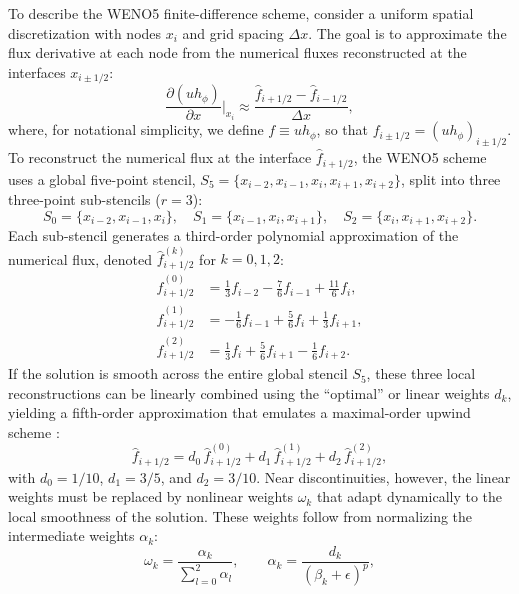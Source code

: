 \documentclass[lineno]{JFM-FLM_Au}
\begin{document}
To describe the WENO5 finite-difference scheme, consider a uniform spatial discretization with nodes $x_i$ and grid spacing $\Delta x$. The goal is to approximate the flux derivative at each node from the numerical fluxes reconstructed at the interfaces $x_{i\pm1/2}$:
\begin{equation}
    \frac{\partial (u h_\phi)}{\partial x}\bigg|_{x_i} \approx \frac{\hat f_{i+1/2} - \hat f_{i-1/2}}{\Delta x},
    \label{eq:weno_deriv}
\end{equation}
where, for notational simplicity, we define $f \equiv u h_\phi$, so that $f_{i\pm1/2} = (u h_\phi)_{i\pm1/2}$. To reconstruct the numerical flux at the interface $\hat f_{i+1/2}$, the WENO5 scheme uses a global five-point stencil, $S_5 = \{x_{i-2},x_{i-1},x_i,x_{i+1},x_{i+2}\}$, split into three three-point sub-stencils ($r=3$):
\begin{equation}
    S_0 = \{x_{i-2},x_{i-1},x_i\}, \quad S_1 = \{x_{i-1},x_i,x_{i+1}\}, \quad S_2 = \{x_i,x_{i+1},x_{i+2}\}.
    \label{eq:substencils}
\end{equation}
Each sub-stencil generates a third-order polynomial approximation of the numerical flux, denoted $\hat f_{i+1/2}^{(k)}$ for $k=0,1,2$:
\begin{align}
    \hat f_{i+1/2}^{(0)} &= \tfrac{1}{3} f_{i-2} - \tfrac{7}{6} f_{i-1} + \tfrac{11}{6} f_i, \label{eq:f0}\\
    \hat f_{i+1/2}^{(1)} &= -\tfrac{1}{6} f_{i-1} + \tfrac{5}{6} f_i + \tfrac{1}{3} f_{i+1}, \label{eq:f1}\\
    \hat f_{i+1/2}^{(2)} &= \tfrac{1}{3} f_i + \tfrac{5}{6} f_{i+1} - \tfrac{1}{6} f_{i+2}. \label{eq:f2}
\end{align}
If the solution is smooth across the entire global stencil $S_5$, these three local reconstructions can be linearly combined using the ``optimal'' or linear weights $d_k$, yielding a fifth-order approximation that emulates a maximal-order upwind scheme \citep{JiangShu1996}:
\begin{equation}
    \hat f_{i+1/2} = d_0\, \hat f_{i+1/2}^{(0)} + d_1\, \hat f_{i+1/2}^{(1)} + d_2\, \hat f_{i+1/2}^{(2)},
    \label{eq:weno_combo}
\end{equation}
with $d_0 = 1/10$, $d_1 = 3/5$, and $d_2 = 3/10$. Near discontinuities, however, the linear weights must be replaced by nonlinear weights $\omega_k$ that adapt dynamically to the local smoothness of the solution. These weights follow from normalizing the intermediate weights $\alpha_k$:
\begin{equation}
    \omega_k = \frac{\alpha_k}{\sum_{l=0}^{2} \alpha_l}, \qquad
    \alpha_k = \frac{d_k}{(\beta_k + \epsilon)^p},
    \label{eq:nonlinear_weights}
\end{equation}
\end{document}

